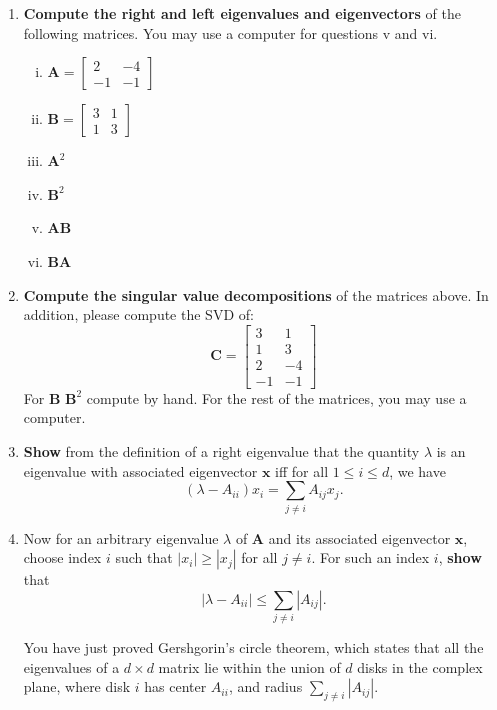 \documentclass{article}\usepackage[utf8]{inputenc}\usepackage[margin=0.4cm,top=0.4cm,bottom=0.4cm]{geometry}\usepackage[usenames,dvipsnames,svgnames,table]{xcolor}
\begin{document}
\begin{enumerate}
\item \textbf{Compute the right and left eigenvalues and eigenvectors} of the following matrices. You may use a computer for questions v and vi.
\begin{enumerate}[i.]
\item $\mathbf{A} = \left[\begin{array}{cc}2 & -4 \\-1 & -1\end{array}\right]$
\BeginSolution

\EndSolution
\item $\mathbf{B} = \left[\begin{array}{cc}3 & 1 \\1 & 3\end{array}\right]$
\BeginSolution

\EndSolution
\item $\mathbf{A}^2$
\BeginSolution

\EndSolution
\item $\mathbf{B}^2$
\BeginSolution

\EndSolution
\item $\mathbf{AB}$
\BeginSolution

\EndSolution
\item $\mathbf{BA}$
\BeginSolution

\EndSolution
\end{enumerate}
\item \textbf{Compute the singular value decompositions} of the matrices above. In addition, please compute the SVD of: $$\mathbf{C} = \left[\begin{array}{cc}3 & 1 \\1 & 3 \\2 & -4 \\-1 & -1\end{array}\right]$$ For $\mathbf{B}$ $\mathbf{B}^2$ compute by hand. For the rest of the matrices, you may use a computer.
\BeginSolution

\EndSolution
\item \textbf{Show} from the definition of a right eigenvalue that the quantity $\lambda$ is an eigenvalue with associated eigenvector $\mathbf{x}$ iff for all $1 \leqslant i \leqslant d$, we have $$(\lambda - A_{ii}) x_i = \sum_{j  \neq i} A_{ij} x_j.$$ 
\BeginSolution

\EndSolution
\item Now for an arbitrary eigenvalue $\lambda$ of $\mathbf{A}$ and its associated eigenvector $\mathbf{x}$, choose index $i$ such that $|x_i| \geqslant |x_j|$ for all $j \neq i$. For such an index $i$, \textbf{show} that $$|\lambda - A_{ii}| \leqslant \sum_{j \neq i} |A_{ij}|.$$
\BeginSolution

\EndSolution
You have just proved Gershgorin's circle theorem, which states that all the eigenvalues of a $d \times d$ matrix lie within the union of $d$ disks in the complex plane, where disk $i$ has center $A_{ii}$, and radius $\sum_{j \neq i} |A_{ij}|$.
\end{enumerate}
\clearpage
\end{document}
